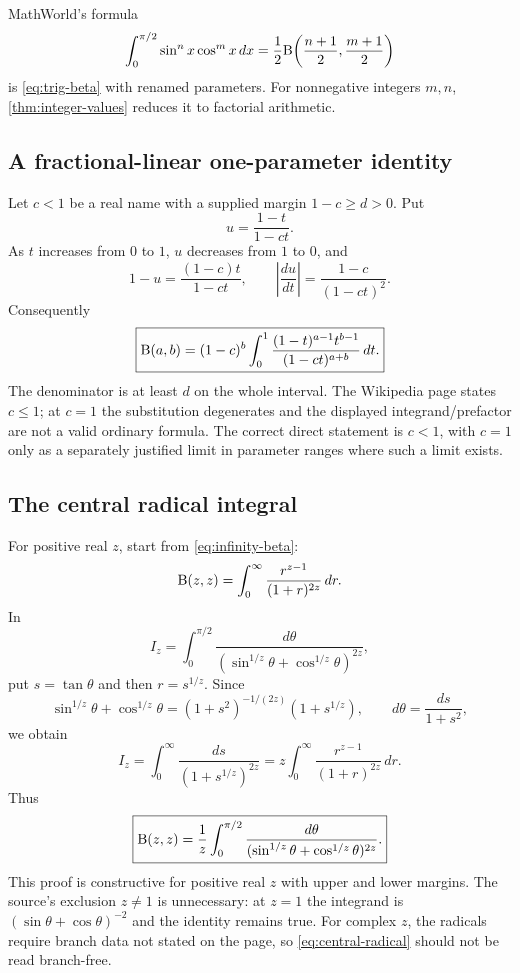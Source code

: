 MathWorld's formula
\[
 \int_0^{\pi/2}\sin^n x\cos^m x\,dx
 =\frac12\mathrm B\!\left(\frac{n+1}{2},\frac{m+1}{2}\right)
\]
is \eqref{eq:trig-beta} with renamed parameters.  For nonnegative integers $m,n$, \cref{thm:integer-values} reduces it to factorial arithmetic.

\subsection{A fractional-linear one-parameter identity}

Let $c<1$ be a real name with a supplied margin $1-c\ge d>0$.  Put
\[
 u=\frac{1-t}{1-ct}.
\]
As $t$ increases from $0$ to $1$, $u$ decreases from $1$ to $0$, and
\[
 1-u=\frac{(1-c)t}{1-ct},
 \qquad
 \left|\frac{du}{dt}\right|=\frac{1-c}{(1-ct)^2}.
\]
Consequently
\begin{equation}
 \boxed{
 \mathrm B(a,b)=(1-c)^b
 \int_0^1\frac{(1-t)^{a-1}t^{b-1}}
 {(1-ct)^{a+b}}\,dt.}
 \label{eq:mobius-beta}
\end{equation}
The denominator is at least $d$ on the whole interval.  The Wikipedia page states $c\le1$; at $c=1$ the substitution degenerates and the displayed integrand/prefactor are not a valid ordinary formula.  The correct direct statement is $c<1$, with $c=1$ only as a separately justified limit in parameter ranges where such a limit exists.

\subsection{The central radical integral}

For positive real $z$, start from \eqref{eq:infinity-beta}:
\[
 \mathrm B(z,z)=\int_0^\infty\frac{r^{z-1}}{(1+r)^{2z}}\,dr.
\]
In
\[
 I_z=\int_0^{\pi/2}
 \frac{d\theta}
 {(\sin^{1/z}\theta+\cos^{1/z}\theta)^{2z}},
\]
put $s=\tan\theta$ and then $r=s^{1/z}$.  Since
\[
 \sin^{1/z}\theta+\cos^{1/z}\theta
 =(1+s^2)^{-1/(2z)}(1+s^{1/z}),
 \qquad d\theta=\frac{ds}{1+s^2},
\]
we obtain
\[
 I_z=\int_0^\infty\frac{ds}{(1+s^{1/z})^{2z}}
 =z\int_0^\infty\frac{r^{z-1}}{(1+r)^{2z}}\,dr.
\]
Thus
\begin{equation}
 \boxed{
 \mathrm B(z,z)=\frac1z\int_0^{\pi/2}
 \frac{d\theta}
 {(\sin^{1/z}\theta+\cos^{1/z}\theta)^{2z}}.}
 \label{eq:central-radical}
\end{equation}
This proof is constructive for positive real $z$ with upper and lower margins.  The source's exclusion $z\ne1$ is unnecessary: at $z=1$ the integrand is $(\sin\theta+\cos\theta)^{-2}$ and the identity remains true.  For complex $z$, the radicals require branch data not stated on the page, so \eqref{eq:central-radical} should not be read branch-free.

